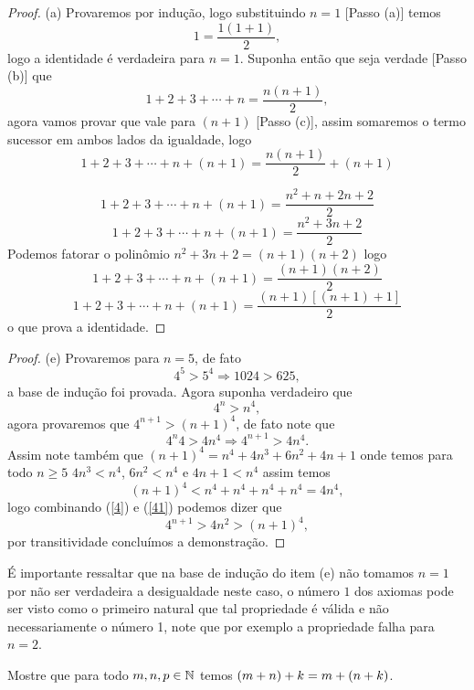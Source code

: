 \begin{proof}
(a) Provaremos por indução, logo substituindo $n=1$ [Passo (a)] temos
$$1 = \frac{1(1+1)}{2},$$
logo a identidade é verdadeira para $n=1$.
Suponha então que seja verdade [Passo (b)] que
$$1+2+3+\cdots+n = \frac{n(n+1)}{2},$$
agora vamos provar que vale para $(n+1)$ [Passo (c)], assim somaremos o termo sucessor em ambos lados da igualdade, logo
$$1+2+3+\cdots+n + (n+1) = \frac{n(n+1)}{2} + (n+1)$$

$$1+2+3+\cdots+n + (n+1) = \frac{n^2+n + 2n+2}{2}$$
$$1+2+3+\cdots+n + (n+1) = \frac{n^2+3n+2}{2}$$
Podemos fatorar o polinômio $n^2+3n+2 = (n+1)(n+2)$ logo
$$1+2+3+\cdots+n + (n+1) = \frac{(n+1)(n+2)}{2}$$
$$1+2+3+\cdots+n + (n+1) = \frac{(n+1)[(n+1)+1]}{2}$$
\noindent o que prova a identidade.
\end{proof}

\begin{proof}
(e) Provaremos para $n=5$, de fato 
$$4^5 > 5^4 \Rightarrow 1024 > 625,$$
a base de indução foi provada. Agora suponha verdadeiro que 
$$4^n > n^4,$$
agora provaremos que $4^{n+1} > (n+1)^4$, de fato note que 
\begin{equation}
\label{4}
4^n4 > 4n^4 \Rightarrow4^{n+1} > 4n^4.
\end{equation}
\inic Assim note também que $(n+1)^4 = n^4+4n^3+6n^2+4n+1$ onde temos para todo $n\geq 5$ $4n^3<n^4$, $6n^2 < n^4$ e $4n + 1 < n^4$ assim temos 
\begin{equation}
\label{41}
    (n+1)^4 < n^4 + n^4 +n^4 + n^4 = 4n^4,
\end{equation}
logo combinando (\ref{4}) e (\ref{41}) podemos dizer que 
$$4^{n+1} > 4n^2 > (n+1)^4,$$
por transitividade concluímos a demonstração.
\end{proof}

\inic É importante ressaltar que na base de indução do item (e) não tomamos $n=1$ por não ser verdadeira a desigualdade neste caso, o número $1$ dos axiomas pode ser visto como o primeiro natural que tal propriedade é válida e não necessariamente o número 1, note que por exemplo a propriedade falha para $n=2$.

\vspace{.5cm}

\noindent \exercicio

\noindent [1] Mostre que para todo $\mathnormal{m},\mathnormal{n},\mathnormal{p} \in \mathbb{N}$ temos $(\mathnormal{m+n})+\mathnormal{k} = \mathnormal{m} + (\mathnormal{n+k})$.

\vspace{.5cm}


